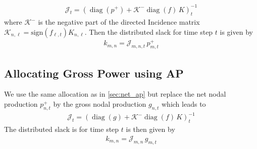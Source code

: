\documentclass[11pt,twocolumn]{article}
\newcommand{\nodalgeneration}[1][n]{g_{#1,t}}
\newcommand{\incidence}[1][n]{K_{#1,\ell}}
\newcommand{\Slack}{k_{m,n}}
\newcommand{\flow}{f_{\ell,t}}
\newcommand{\netproduction}[1][n]{p^{+}_{#1,t}}
\newcommand{\incidenceM}{K}
\newcommand{\flowM}{f}
\newcommand{\injectionM}{p}
\newcommand{\DirectedIncidence}{\mathcal{K}}
\newcommand{\InverseAPInjection}{\mathcal{J}}
\newcommand\diag[1]{\operatorname{diag}\left(#1\right)}
\begin{document}
\begin{align}
\InverseAPInjection_t = \left( \diag{\injectionM^+} + \DirectedIncidence^- \diag{\flowM} \, \incidenceM \right)_t^{-1} 
\end{align}
where $\DirectedIncidence^-$ is the negative part of the directed Incidence matrix $\DirectedIncidence_{n,\ell} = \text{sign}\left( \flow \right)  \incidence$. Then the distributed slack for time step $t$ is given by
\begin{align}
\Slack = \InverseAPInjection_{m,n,t} \, \netproduction[m]
\end{align}

\subsection{Allocating Gross Power using AP}
\label{sec:gross_ap}

We use the same allocation as in \cref{sec:net_ap} but replace the net nodal production $\netproduction$ by the gross nodal production $\nodalgeneration$ which leads to  
\begin{align}
\InverseAPInjection_t = \left( \diag{g} + \DirectedIncidence^- \diag{\flowM} \, \incidenceM \right)_t^{-1} 
\end{align}
The distributed slack is for time step $t$ is then given by
\begin{align}
\Slack = \InverseAPInjection_{m,n} \, \nodalgeneration[m]
\end{align}



\clearpage
\printbibliography
\end{document}
